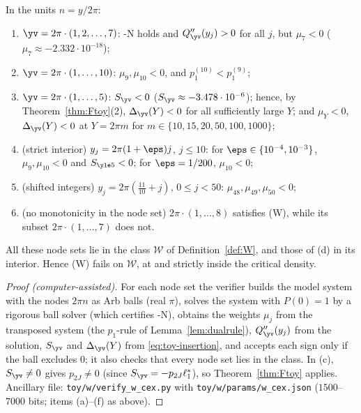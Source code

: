 \begin{proposition}[Counterexamples to W]\label{prop:W-false}
In the units $n=y/2\pi$:
\begin{enumerate}[label=\textup{(\alph*)}]
\item $\yv=2\pi\cdot(1,2,\dots,7)$: \hyp{N} holds and $Q''_{\yv}(y_j)>0$ for all $j$, but $\mu_7<0$
\textup{(}$\mu_7\approx-2.332\cdot10^{-18}$\textup{)};
\item $\yv=2\pi\cdot(1,\dots,10)$: $\mu_9,\mu_{10}<0$, and $p_1^{(10)}<p_1^{(9)}$;
\item $\yv=2\pi\cdot(1,\dots,5)$: $S_{\yv}<0$ \textup{(}$S_{\yv}\approx-3.478\cdot10^{-6}$\textup{)}; hence, by
Theorem~\ref{thm:Ftoy}\textup{(2)}, $\Delta_{\yv}(Y)<0$ for all sufficiently large $Y$; and $\mu_Y<0$, $\Delta_{\yv}(Y)<0$ at
$Y=2\pi m$ for $m\in\{10,15,20,50,100,1000\}$;
\item \textup{(strict interior)} $y_j=2\pi(1+\eps)j$, $j\le10$: for $\eps\in\{10^{-4},10^{-3}\}$, $\mu_9,\mu_{10}<0$ and
$S_{\yle5}<0$; for $\eps=1/200$, $\mu_{10}<0$;
\item \textup{(shifted integers)} $y_j=2\pi(\frac{11}{10}+j)$, $0\le j<50$: $\mu_{48},\mu_{49},\mu_{50}<0$;
\item \textup{(no monotonicity in the node set)} $2\pi\cdot(1,\dots,8)$ satisfies \textup{(W)}, while its subset
$2\pi\cdot(1,\dots,7)$ does not.
\end{enumerate}
All these node sets lie in the class $\mathcal W$ of Definition~\ref{def:W}, and those of \textup{(d)} in its interior.
Hence \textup{(W)} fails on $\mathcal W$, at and strictly inside the critical density.
\end{proposition}

\begin{proof}[Proof \textup{(computer-assisted)}]
For each node set the verifier builds the model system with the nodes $2\pi n$ as Arb balls (real $\pi$), solves the
system with $P(0)=1$ by a rigorous ball solver (which certifies \hyp{N}), obtains the weights $\mu_j$ from the transposed
system (the $p_1$-rule of Lemma~\ref{lem:dualrule}), $Q''_{\yv}(y_j)$ from the solution, $S_{\yv}$ and $\Delta_{\yv}(Y)$ from
\eqref{eq:toy-insertion}, and accepts each sign only if the ball excludes $0$; it also checks that every node set lies in
the class. In (c), $S_{\yv}\ne0$ gives $p_{2J}\ne0$ (since $S_{\yv}=-p_{2J}\ell_1^*$), so Theorem~\ref{thm:Ftoy} applies.
Ancillary file: \nolinkurl{toy/w/verify_w_cex.py} with \nolinkurl{toy/w/params/w_cex.json} ($1500$--$7000$ bits; items
(a)--(f) as above).
\end{proof}

